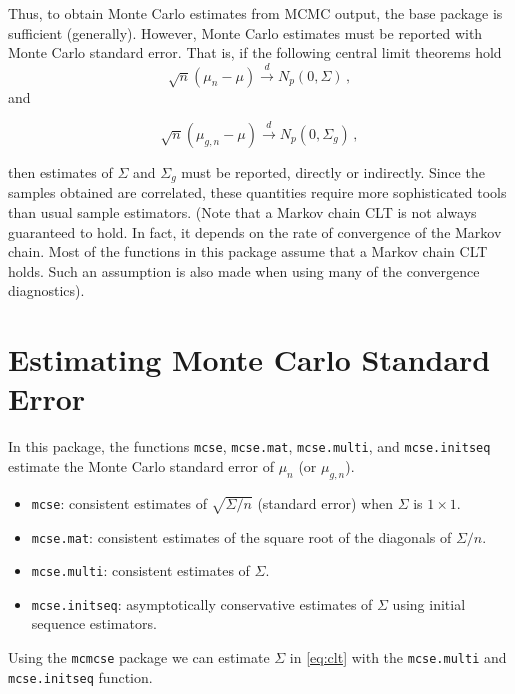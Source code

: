 \documentclass[11pt]{article}\usepackage[]{graphicx}\usepackage[]{color}
\begin{document}
Thus, to obtain Monte Carlo estimates from MCMC output, the base package is sufficient (generally). However, Monte Carlo estimates must be reported with Monte Carlo standard error. That is, if the following central limit theorems hold
\begin{equation}
\label{eq:clt}
\sqrt{n}(\mu_n - \mu) \overset{d}{\to} N_p(0, \Sigma)\,,
\end{equation}
and

\begin{equation}
\label{eq:g_clt}
\sqrt{n}(\mu_{g,n} - \mu) \overset{d}{\to} N_p(0, \Sigma_g)\,,
\end{equation}

then estimates of $\Sigma$ and $\Sigma_g$ must be reported, directly or indirectly. Since the samples obtained are correlated, these quantities require more sophisticated tools than usual sample estimators.
(Note that a Markov chain CLT is not always guaranteed to hold. In fact, it depends on the rate of convergence of the Markov chain. Most of the functions in this package assume that a Markov chain CLT holds. Such an assumption is also made when using many of the convergence diagnostics).

\section{Estimating Monte Carlo Standard Error}
In this package, the functions \texttt{mcse}, \texttt{mcse.mat}, \texttt{mcse.multi}, and \texttt{mcse.initseq} estimate the Monte Carlo standard error of $\mu_n$ (or $\mu_{g,n}$).
\begin{itemize}
\item \texttt{mcse}: consistent estimates of $\sqrt{\Sigma/n}$ (standard error) when $\Sigma$ is $1 \times 1$. 
\item \texttt{mcse.mat}: consistent estimates of the square root of the  diagonals of $\Sigma/n$.
\item \texttt{mcse.multi}: consistent estimates of $\Sigma$.
\item \texttt{mcse.initseq}: asymptotically conservative estimates of $\Sigma$ using initial sequence estimators.
\end{itemize}

Using the \texttt{mcmcse} package we can estimate $\Sigma$ in \eqref{eq:clt} with the \texttt{mcse.multi} and \texttt{mcse.initseq} function. 
\end{document}
